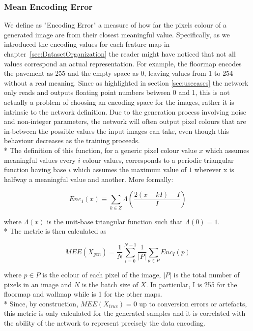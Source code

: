 \subsubsection{Mean Encoding Error}
We define as "Encoding Error" a measure of how far the pixels colour of a generated image are from their closest meaningful value. Specifically, as we introduced the encoding values for each feature map in chapter~\ref{sec:DatasetOrganization} the reader might have noticed that not all values correspond an actual representation. For example, the \gls{floormap} encodes the pavement as 255 and the empty space as 0, leaving values from 1 to 254 without a real meaning. Since as highlighted in section \ref{sec:usecases} the network only reads and outputs floating point numbers between 0 and 1, this is not actually a problem of choosing an encoding space for the images, rather it is intrinsic to the network definition. Due to the generation process involving noise and non-integer parameters, the network will often output pixel colours that are in-between the possible values the input images can take, even though this behaviour decreases as the training proceeds. \\*
The definition of this function, for a generic pixel colour value $x$ which assumes meaningful values every $i$ colour values, corresponds to a periodic triangular function having base $i$ which assumes the maximum value of $1$ wherever x is halfway a meaningful value and another. More formally:

\begin{equation}
Enc_{I}(x) \equiv \sum_{k \in Z} \Lambda (\frac{2(x-kI)-I}{I})
\end{equation}


where $ \Lambda(x) $ is the unit-base triangular function such that $ \Lambda(0) = 1 $. \\*
The metric is then calculated as 

\begin{equation}
MEE(X_{gen}) = \frac{1}{N}\sum_{i=0}^{N-1} \frac{1}{|P|} \sum_{p\in P} Enc_I(p)
\end{equation}

where $p\in P$ is the colour of each pixel of the image, $|P|$ is the total number of pixels in an image and $N$ is the batch size of $X$. In particular, I is 255 for the \gls{floormap} and \gls{wallmap} while is 1 for the other maps.  \\*
Since, by construction, $MEE(X_{true}) = 0$ up to conversion errors or artefacts, this metric is only calculated for the generated samples and it is correlated with the ability of the network to represent precisely the data encoding.


